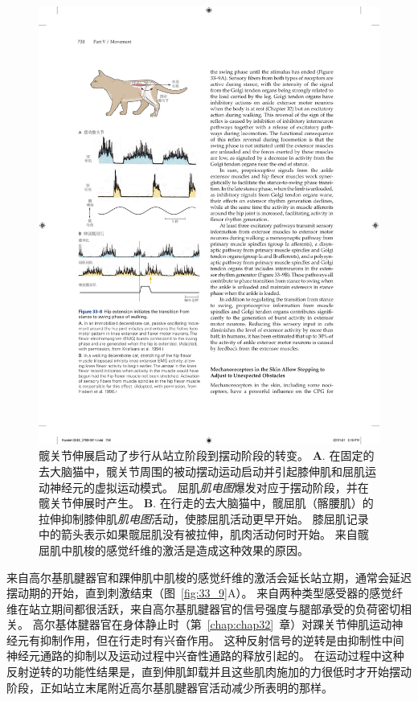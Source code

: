 \begin{figure}[htbp]
	\centering
	\includegraphics[width=0.65\linewidth]{chap33/fig_33_8}
	\caption{髋关节伸展启动了步行从站立阶段到摆动阶段的转变。
	\textbf{A}. 在固定的去大脑猫中，髋关节周围的被动摆动运动启动并引起膝伸肌和屈肌运动神经元的虚拟运动模式。
	屈肌\textit{肌电图}爆发对应于摆动阶段，并在髋关节伸展时产生\cite{kriellaars1994mechanical}。
	\textbf{B}. 在行走的去大脑猫中，髋屈肌（髂腰肌）的拉伸抑制膝伸肌\textit{肌电图}活动，使膝屈肌活动更早开始。
	膝屈肌记录中的箭头表示如果髋屈肌没有被拉伸，肌肉活动何时开始。
	来自髋屈肌中肌梭的感觉纤维的激活是造成这种效果的原因\cite{hiebert1996contribution}。}
	\label{fig:33_8}
\end{figure}


来自高尔基肌腱器官和踝伸肌中肌梭的感觉纤维的激活会延长站立期，通常会延迟摆动期的开始，直到刺激结束（图~\ref{fig:33_9}A）。
来自两种类型感受器的感觉纤维在站立期间都很活跃，来自高尔基肌腱器官的信号强度与腿部承受的负荷密切相关。
高尔基体腱器官在身体静止时（第~\ref{chap:chap32}~章）对踝关节伸肌运动神经元有抑制作用，但在行走时有兴奋作用。
这种反射信号的逆转是由抑制性中间神经元通路的抑制以及运动过程中兴奋性通路的释放引起的。
在运动过程中这种反射逆转的功能性结果是，直到伸肌卸载并且这些肌肉施加的力很低时才开始摆动阶段，正如站立末尾附近高尔基肌腱器官活动减少所表明的那样。


